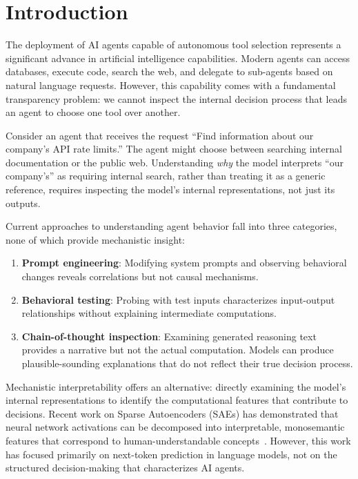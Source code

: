 \documentclass[runningheads]{llncs}
\begin{document}
\section{Introduction}

The deployment of AI agents capable of autonomous tool selection represents a significant advance in artificial intelligence capabilities. Modern agents can access databases, execute code, search the web, and delegate to sub-agents based on natural language requests. However, this capability comes with a fundamental transparency problem: we cannot inspect the internal decision process that leads an agent to choose one tool over another.

Consider an agent that receives the request ``Find information about our company's API rate limits.'' The agent might choose between searching internal documentation or the public web. Understanding \emph{why} the model interprets ``our company's'' as requiring internal search, rather than treating it as a generic reference, requires inspecting the model's internal representations, not just its outputs.

Current approaches to understanding agent behavior fall into three categories, none of which provide mechanistic insight:

\begin{enumerate}
\item \textbf{Prompt engineering}: Modifying system prompts and observing behavioral changes reveals correlations but not causal mechanisms.
\item \textbf{Behavioral testing}: Probing with test inputs characterizes input-output relationships without explaining intermediate computations.
\item \textbf{Chain-of-thought inspection}: Examining generated reasoning text provides a narrative but not the actual computation. Models can produce plausible-sounding explanations that do not reflect their true decision process.
\end{enumerate}

Mechanistic interpretability offers an alternative: directly examining the model's internal representations to identify the computational features that contribute to decisions. Recent work on Sparse Autoencoders (SAEs) has demonstrated that neural network activations can be decomposed into interpretable, monosemantic features that correspond to human-understandable concepts~\cite{ref_bricken2023,cunningham2023sparseautoencodershighlyinterpretable}. However, this work has focused primarily on next-token prediction in language models, not on the structured decision-making that characterizes AI agents.
\end{document}
